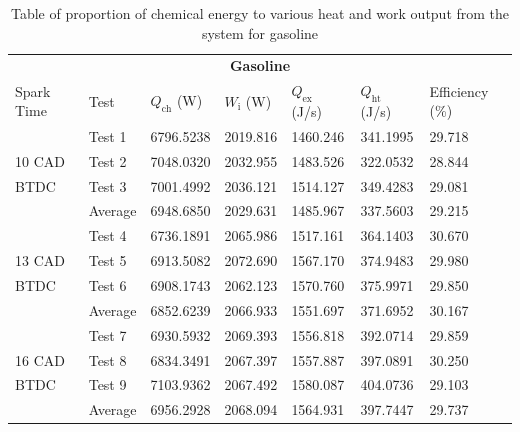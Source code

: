 \documentclass[11pt]{article}
\begin{document}
\begin{table}[H]
	\begin{center}
	\begin{tabular}{@{}l l l l l l l@{}}
		\toprule
		\multicolumn{7}{c}{\textbf{Gasoline}}\\
		Spark Time & Test & $Q_\textrm{ch}$ (W) & $W_\textrm{i}$ (W) & $Q_\textrm{ex}$ (J/s) & $Q_\textrm{ht}$ (J/s) & Efficiency (\%)\\
		\midrule
				& Test 1  & 6796.5238 & 2019.816 & 1460.246 & 341.1995 & 29.718\\
		10 CAD	& Test 2  & 7048.0320 & 2032.955 & 1483.526 & 322.0532 & 28.844\\
		BTDC	& Test 3  & 7001.4992 & 2036.121 & 1514.127 & 349.4283 & 29.081\\
				& Average & 6948.6850 & 2029.631 & 1485.967 & 337.5603 & 29.215\\
				& Test 4  & 6736.1891 & 2065.986 & 1517.161 & 364.1403 & 30.670\\
		13 CAD	& Test 5  & 6913.5082 & 2072.690 & 1567.170 & 374.9483 & 29.980\\
		BTDC	& Test 6  & 6908.1743 & 2062.123 & 1570.760 & 375.9971 & 29.850\\
				& Average & 6852.6239 & 2066.933 & 1551.697 & 371.6952 & 30.167\\	
				& Test 7  & 6930.5932 & 2069.393 & 1556.818 & 392.0714 & 29.859\\
		16 CAD	& Test 8  & 6834.3491 & 2067.397 & 1557.887 & 397.0891 & 30.250\\
		BTDC	& Test 9  & 7103.9362 & 2067.492 & 1580.087 & 404.0736 & 29.103\\
				& Average & 6956.2928 & 2068.094 & 1564.931 & 397.7447 & 29.737\\		
		\bottomrule
	\end{tabular}
	\caption{Table of proportion of chemical energy to various heat and work output from the system for gasoline}
	\label{q4-t1}
	\end{center}
\end{table}
\end{document}

